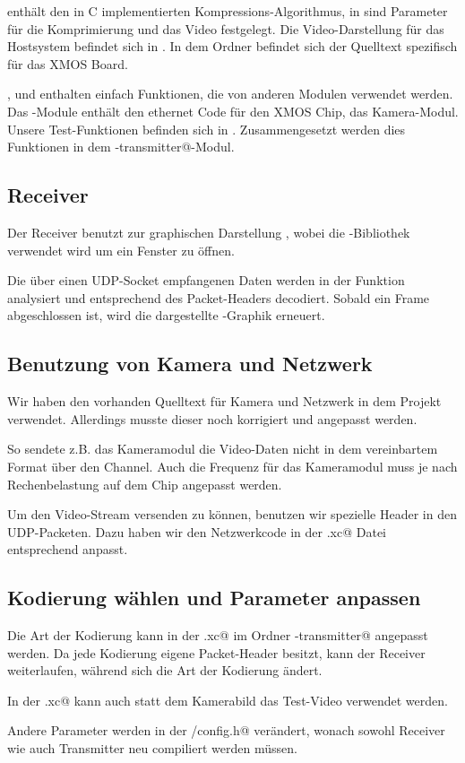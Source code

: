 \verb@codec@ enthält den in C implementierten Kompressions-Algorithmus,
in \verb@videfs@ sind Parameter für die Komprimierung und das Video festgelegt.
Die Video-Darstellung für das Hostsystem befindet sich in \verb@receiver@.
In dem \verb@board@ Ordner befindet sich der Quelltext spezifisch für das XMOS Board.

\verb@common@, \verb@chksum@ und \verb@compat@ enthalten einfach Funktionen,
die von anderen Modulen verwendet werden. 
Das \verb@net@-Module enthält den ethernet Code für den XMOS Chip,
\verb@cam@ das Kamera-Modul.
Unsere Test-Funktionen befinden sich in \verb@test@. Zusammengesetzt
werden dies Funktionen in dem \verb@stream-transmitter@-Modul.

\subsection{Receiver}
Der Receiver benutzt zur graphischen Darstellung \verb@gl@, 
wobei die \verb@glut@-Bibliothek verwendet wird um ein Fenster zu öffnen.

Die über einen UDP-Socket empfangenen Daten werden in der \lstinline@receiver@
Funktion analysiert und entsprechend des Packet-Headers decodiert. 
Sobald ein Frame abgeschlossen ist, wird die dargestellte \verb@gl@-Graphik 
erneuert.

\subsection{Benutzung von Kamera und Netzwerk}
Wir haben den vorhanden Quelltext für Kamera und Netzwerk in dem Projekt
verwendet. Allerdings musste dieser noch korrigiert und angepasst werden.

So sendete z.B. das Kameramodul die Video-Daten nicht in dem vereinbartem Format
über den Channel. Auch die Frequenz für das Kameramodul muss je nach
Rechenbelastung auf dem Chip angepasst werden.

Um den Video-Stream versenden zu können, benutzen wir spezielle Header in den
UDP-Packeten. Dazu haben wir den Netzwerkcode in der \verb@udb.xc@ Datei
entsprechend anpasst.

\subsection{Kodierung wählen und Parameter anpassen}

Die Art der Kodierung kann in der \verb@main.xc@ im Ordner
\verb@board\streaming-transmitter@ angepasst werden. Da jede Kodierung
eigene Packet-Header besitzt, kann der Receiver weiterlaufen, während sich
die Art der Kodierung ändert.

In der \verb@main.xc@ kann auch statt dem Kamerabild das Test-Video verwendet
werden.

Andere Parameter werden in der \verb@videfs/config.h@ verändert, 
wonach sowohl Receiver wie auch Transmitter neu compiliert werden müssen.



